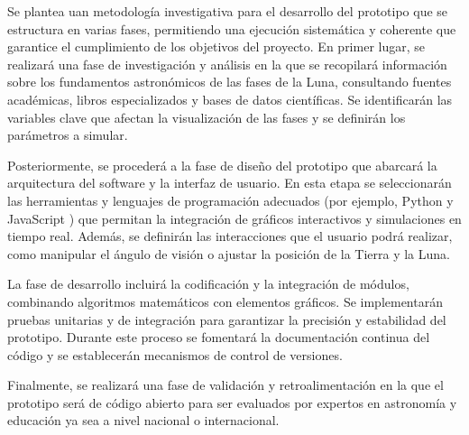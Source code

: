 Se plantea uan metodología investigativa para el desarrollo del prototipo que se estructura en varias fases, permitiendo una ejecución
sistemática y coherente que garantice el cumplimiento de los objetivos del proyecto. En primer lugar, se realizará 
una fase de investigación y análisis en la que se recopilará información sobre los fundamentos astronómicos de las
fases de la Luna, consultando fuentes académicas, libros especializados y bases de datos científicas. Se identificarán
las variables clave que afectan la visualización de las fases y se definirán los parámetros a simular.

Posteriormente, se procederá a la fase de diseño del prototipo que abarcará la arquitectura
del software y la interfaz de usuario. En esta etapa se seleccionarán las herramientas y lenguajes de programación adecuados
(por ejemplo, Python y JavaScript ) que permitan la integración de gráficos interactivos y simulaciones en tiempo real.
Además, se definirán las interacciones que el usuario podrá realizar, como manipular el ángulo de visión o ajustar la posición
de la Tierra y la Luna.

La fase de desarrollo incluirá la codificación y la integración de módulos, combinando algoritmos matemáticos con elementos gráficos.
Se implementarán pruebas unitarias y de integración para garantizar la precisión y estabilidad del prototipo. Durante este proceso se
fomentará la documentación continua del código y se establecerán mecanismos de control de versiones.

Finalmente, se realizará una fase de validación y retroalimentación en la que el prototipo será de código abierto para ser
evaluados  por expertos en astronomía y educación ya sea a nivel nacional o internacional.